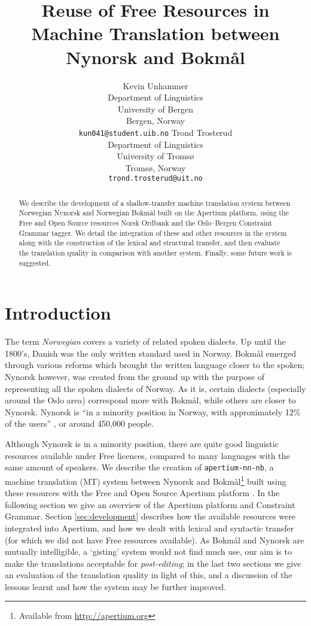 \documentclass[11pt]{article}
\author{Kevin Unhammer\\  Department of Linguistics \\ University of Bergen \\  Bergen, Norway \\  {\tt \small   kun041@student.uib.no} \And  Trond Trosterud \\  Department of Linguistics \\  University of Tromsø \\  Tromsø, Norway \\    {\tt \small  trond.trosterud@uit.no}}
\title{Reuse of Free Resources in Machine Translation between Nynorsk and Bokmål}
\begin{document}
\maketitle

  \begin{abstract}
    We describe the development of a shallow-transfer machine
    translation system between Norwegian Nynorsk and Norwegian Bokmål
    built on the Apertium platform, using the Free and Open Source
    resources Norsk Ordbank and the Oslo–Bergen Constraint Grammar
    tagger. We detail the integration of these and other resources in
    the system along with the construction of the lexical and
    structural transfer, and then evaluate the translation quality in
    comparison with another system. Finally, some future work is
    suggested.
  \end{abstract}

\section{Introduction}
The term \emph{Norwegian} covers a variety of related spoken dialects.
Up until the 1800's, Danish was the only written standard used in
Norway. Bokmål emerged through various reforms which brought the
written language closer to the spoken; Nynorsk however, was created
from the ground up with the purpose of representing all the spoken
dialects of Norway. As it is, certain dialects (especially around the
Oslo area) correspond more with Bokmål, while others are closer to
Nynorsk. Nynorsk is ``in a minority position in Norway, with
approximately 12\% of the users'' \citep{everson2000sln}, or around
450,000 people.

Although Nynorsk is in a minority position, there are quite good
linguistic resources available under Free licences, compared to many
languages with the same amount of speakers. We describe the creation
of {\tt \small apertium-nn-nb}, a machine translation (MT) system
between Nynorsk and Bokmål\footnote{Available from
  \href{http://apertium.org}{http://apertium.org} } built using these
resources with the Free and Open Source Apertium platform
\citep{armentano2006ops}. In the following section we give an overview
of the Apertium platform and Constraint Grammar. Section
\ref{sec:development} describes how the available resources were
integrated into Apertium, and how we dealt with lexical and syntactic
transfer (for which we did not have Free resources available). As
Bokmål and Nynorsk are mutually intelligible, a `gisting' system would
not find much use, our aim is to make the translations acceptable for
\emph{post-editing}; in the last two sections we give an evaluation of
the translation quality in light of this, and a discussion of the
lessons learnt and how the system may be further improved.
\end{document}
